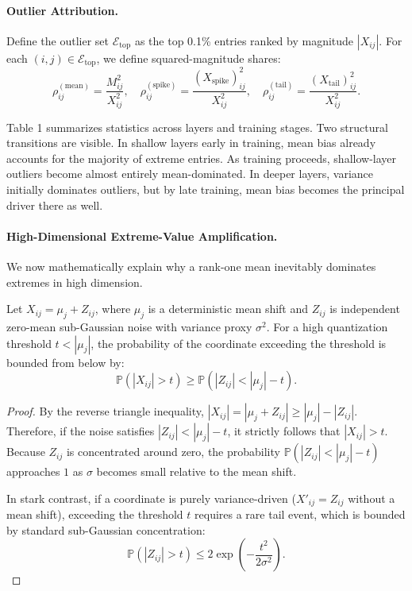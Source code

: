 \paragraph{Outlier Attribution.} 
Define the outlier set $\mathcal{E}_{\text{top}}$ as the top 0.1\% entries ranked by magnitude $|X_{ij}|$. For each $(i,j) \in \mathcal{E}_{\text{top}}$, we define squared-magnitude shares:
\begin{equation}
\rho_{ij}^{(\text{mean})} = \frac{M_{ij}^2}{X_{ij}^2}, \quad \rho_{ij}^{(\text{spike})} = \frac{(X_{\text{spike}})_{ij}^2}{X_{ij}^2}, \quad \rho_{ij}^{(\text{tail})} = \frac{(X_{\text{tail}})_{ij}^2}{X_{ij}^2}.
\end{equation}

Table 1 summarizes statistics across layers and training stages. Two structural transitions are visible. In shallow layers early in training, mean bias already accounts for the majority of extreme entries. As training proceeds, shallow-layer outliers become almost entirely mean-dominated. In deeper layers, variance initially dominates outliers, but by late training, mean bias becomes the principal driver there as well.

\paragraph{High-Dimensional Extreme-Value Amplification.} 
We now mathematically explain why a rank-one mean inevitably dominates extremes in high dimension.

\begin{theorem}
Let $X_{ij} = \mu_j + Z_{ij}$, where $\mu_j$ is a deterministic mean shift and $Z_{ij}$ is independent zero-mean sub-Gaussian noise with variance proxy $\sigma^2$. For a high quantization threshold $t < |\mu_j|$, the probability of the coordinate exceeding the threshold is bounded from below by:
\begin{equation}
\mathbb{P}(|X_{ij}| > t) \ge \mathbb{P}(|Z_{ij}| < |\mu_j| - t).
\end{equation}
\end{theorem}

\begin{proof}
By the reverse triangle inequality, $|X_{ij}| = |\mu_j + Z_{ij}| \ge |\mu_j| - |Z_{ij}|$. Therefore, if the noise satisfies $|Z_{ij}| < |\mu_j| - t$, it strictly follows that $|X_{ij}| > t$. Because $Z_{ij}$ is concentrated around zero, the probability $\mathbb{P}(|Z_{ij}| < |\mu_j| - t)$ approaches $1$ as $\sigma$ becomes small relative to the mean shift.

In stark contrast, if a coordinate is purely variance-driven ($X'_{ij} = Z_{ij}$ without a mean shift), exceeding the threshold $t$ requires a rare tail event, which is bounded by standard sub-Gaussian concentration:
\begin{equation}
\mathbb{P}(|Z_{ij}| > t) \le 2\exp\left(-\frac{t^2}{2\sigma^2}\right).
\end{equation}
\end{proof}

